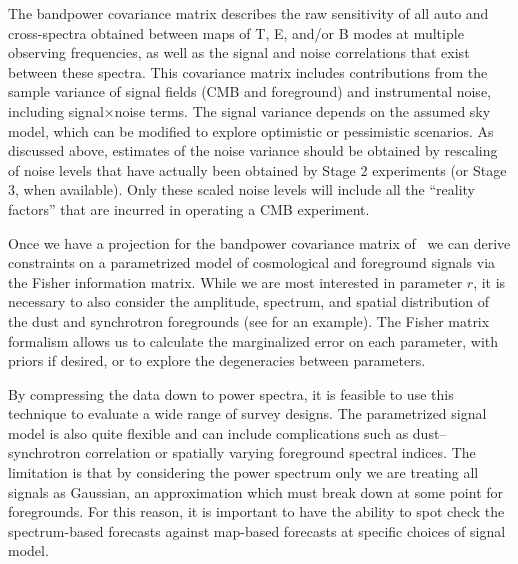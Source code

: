 The bandpower covariance matrix describes the raw sensitivity of all auto and cross-spectra obtained between maps of T, E, and/or B modes at multiple observing frequencies, as well as the signal and noise correlations that exist between these spectra.
This covariance matrix includes contributions from the sample variance of signal fields (CMB and foreground) and instrumental noise, including signal$\times$noise terms.
The signal variance depends on the assumed sky model, which can be modified to explore optimistic or pessimistic scenarios.
As discussed above, estimates of the noise variance should be obtained by rescaling of noise levels that have actually been obtained by Stage 2 experiments (or Stage 3, when available).
Only these scaled noise levels will include all the ``reality factors'' that are incurred in operating a CMB experiment.

Once we have a projection for the bandpower covariance matrix of \cmbexp\, we can derive constraints on a parametrized model of cosmological and foreground signals via the Fisher information matrix.
While we are most interested in parameter $r$, it is necessary to also consider the amplitude, spectrum, and spatial distribution of the dust and synchrotron foregrounds (see \cite{Ade:2015tva} for an example).
The Fisher matrix formalism allows us to calculate the marginalized error on each parameter, with priors if desired, or to explore the degeneracies between parameters.

By compressing the data down to power spectra, it is feasible to use this technique to evaluate a wide range of survey designs.
The parametrized signal model is also quite flexible and can include complications such as dust--synchrotron correlation or spatially varying foreground spectral indices.
The limitation is that by considering the power spectrum only we are treating all signals as Gaussian, an approximation which must break down at some point for foregrounds.
For this reason, it is important to have the ability to spot check the spectrum-based forecasts against map-based forecasts at specific choices of signal model.

